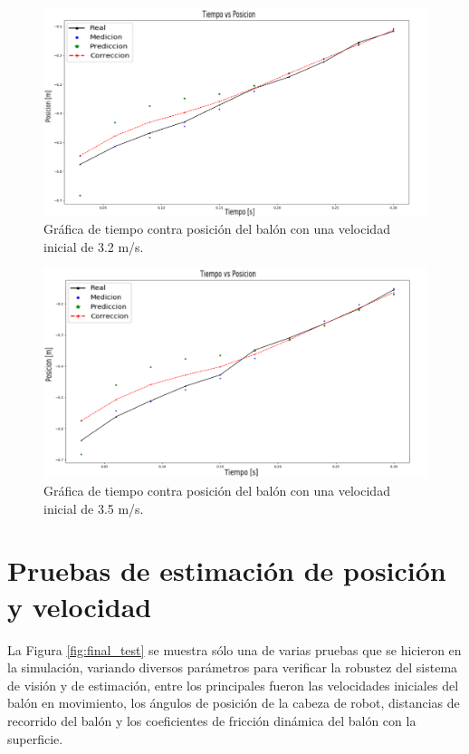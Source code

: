 \begin{figure}
\centering
	\includegraphics[scale=0.3]{images/test_vel_3dot2.png}
	\caption{Gráfica de tiempo contra posición del balón con una velocidad inicial de 3.2 m/s.}
	\label{fig:estimator_graphic_2}
\end{figure}

\begin{figure}
\centering
	\includegraphics[scale=0.3]{images/test_vel_3dot5.png}
	\caption{Gráfica de tiempo contra posición del balón con una velocidad inicial de 3.5 m/s.}	
	\label{fig:estimator_graphic_3}
\end{figure}
	
	\section{Pruebas de estimación de posición y velocidad}
	La Figura \ref{fig:final_test} se muestra sólo una de varias pruebas que se hicieron en la simulación, variando diversos parámetros para verificar la robustez del sistema de visión y de estimación, entre los principales fueron las velocidades iniciales del balón en movimiento, los ángulos de posición de la cabeza de robot, distancias de recorrido del balón y los coeficientes de fricción dinámica del balón con la superficie.
	
